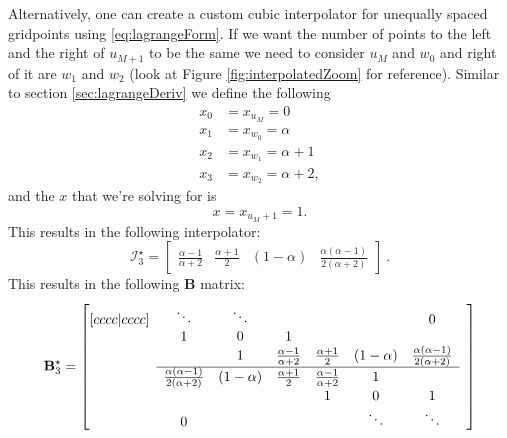 \documentclass[dvipsnames]{article}
\begin{document}
Alternatively, one can create a custom cubic interpolator for unequally spaced gridpoints using \eqref{eq:lagrangeForm}. If we want the number of points to the left and the right of $u_{M+1}$ to be the same we need to consider $u_M$ and $w_0$ and right of it are $w_1$ and $w_2$ (look at Figure \ref{fig:interpolatedZoom} for reference). Similar to section \ref{sec:lagrangeDeriv} we define the following 
\begin{equation}
    \begin{aligned}
     x_0 &= x_{u_{M}} = 0 \\
     x_1 &= x_{w_0} = \alpha \\
     x_2& = x_{w_1} = \alpha + 1 \\
     x_3 &= x_{w_2} = \alpha + 2,
    \end{aligned}
\end{equation}
and the $x$ that we're solving for is 
\begin{equation}
    x = x_{u_M+1} = 1.
\end{equation}
This results in the following interpolator:
\begin{equation}
    \mathcal{I}_3^\star = 
    \begin{bmatrix}
        \frac{\alpha - 1}{\alpha + 2} &
        \frac{\alpha + 1}{2}&
       (1-\alpha) &
       \frac{\alpha(\alpha - 1)}{2(\alpha + 2)}
    \end{bmatrix}\ .
\end{equation}
This results in the following $\mathbf{B}$ matrix:
\begin{equation}
    \mathbf{B}_3^\star = \begin{bmatrix}[cccc|cccc]
     & \ddots  &\ddots & & & & 0 & \\
       & 1 & 0 & 1 & & & & \\
      & & 1 & \frac{\alpha - 1}{\alpha + 2} & \frac{\alpha + 1}{2} & (1-\alpha) &\frac{\alpha(\alpha - 1)}{2(\alpha + 2)} \\ \cline{2-7}
      & \frac{\alpha(\alpha - 1)}{2(\alpha + 2)} & (1-\alpha) & \frac{\alpha + 1}{2} & \frac{\alpha - 1}{\alpha + 2} & 1 & & \\
         & & & &1 & 0 & 1  \\
         & 0 & &  &  &\ddots & \ddots &
    \end{bmatrix}
\end{equation}
\end{document}
